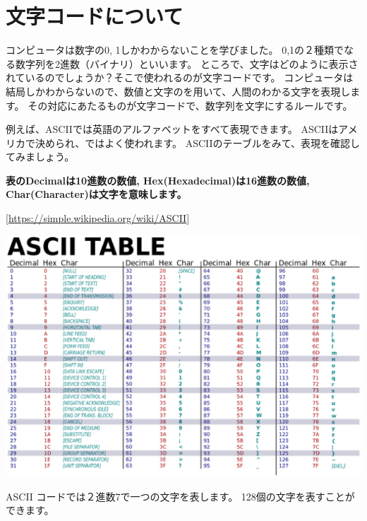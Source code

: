 
\clearpage
{}\label{P:charCode}
\section{文字コードについて}
コンピュータは数字の0,
1しかわからないことを学びました。
0,1の２種類でなる数字列を2進数（バイナリ）といいます。
ところで、文字はどのように表示されているのでしょうか？そこで使われるのが文字コードです。
コンピュータは結局しかわからないので、数値と文字のを用いて、人間のわかる文字を表現します。
その対応にあたるものが文字コードで、数字列を文字にするルールです。

例えば、ASCIIでは英語のアルファベットをすべて表現できます。
ASCIIはアメリカで決められ、ではよく使われます。
ASCIIのテーブルをみて、表現を確認してみましょう。


\bigskip

{\bfseries
表のDecimalは10進数の数値,
Hex(Hexadecimal)は16進数の数値,
Char(Character)は文字を意味します。}


\bigskip

[\url{https://simple.wikipedia.org/wiki/ASCII}]

\begin{center}
\includegraphics[width=14cm]{./text08-img/textbook-img016.eps}

\end{center}
ASCII
コードでは２進数7で一つの文字を表します。
128個の文字を表すことができます。


\bigskip


\bigskip


